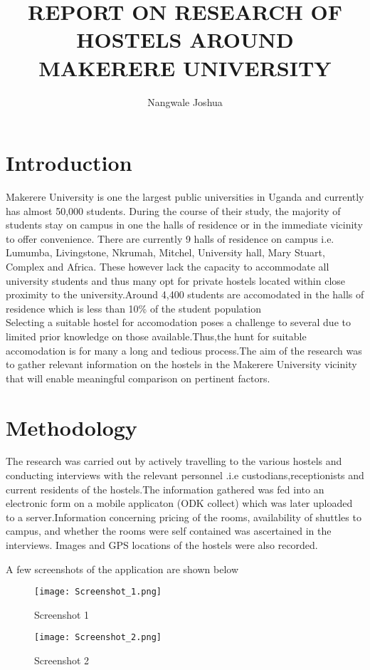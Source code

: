 \documentclass{article}
\begin{document}
\title{REPORT ON RESEARCH OF HOSTELS AROUND MAKERERE UNIVERSITY}
\author{Nangwale Joshua}
\maketitle

\section{Introduction}

Makerere University is one the largest public universities in Uganda and currently has almost 50,000 students. During the course of their study, the majority of students stay on campus in one the halls  of residence or in the immediate vicinity to offer convenience. There are currently  9 halls of residence on campus i.e. Lumumba, Livingstone, Nkrumah, Mitchel, University hall, Mary Stuart, Complex and Africa. These however lack the capacity to accommodate all  university students and thus many opt for private hostels located within close proximity to the university.Around 4,400 students are accomodated in the halls of residence which is less than 10\% of the student population\\ Selecting a suitable hostel for accomodation poses a challenge to several due to limited prior knowledge on those available.Thus,the hunt for suitable accomodation is for many a long and tedious process.The aim of the research was to gather relevant information on the hostels in the Makerere University vicinity that will enable meaningful comparison on pertinent factors.

\section{Methodology}
The research was carried out by actively travelling to the various hostels and conducting interviews with the relevant personnel .i.e custodians,receptionists and current residents of the hostels.The information gathered was fed into an electronic form on a mobile applicaton (ODK collect) which was later uploaded to a server.Information concerning pricing of the rooms, availability of shuttles to campus, and whether the rooms were self contained was ascertained in the interviews. Images and GPS locations of the hostels were also recorded.

A few screenshots of the application are shown below
\begin{figure}[!htb]

\texttt{[image: Screenshot\_1.png]}
\caption{Screenshot 1}
\endminipage\hfill
{}
\texttt{[image: Screenshot\_2.png]}
\caption{Screenshot 2}
\endminipage\hfill


\end{figure}
\end{document}
